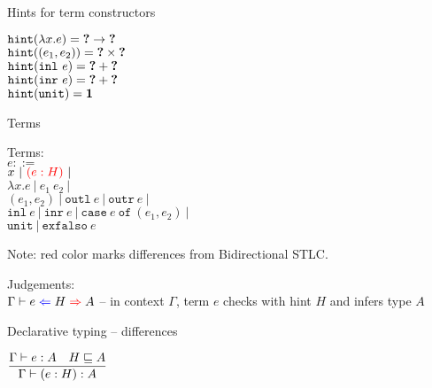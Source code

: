 \documentclass{beamer}
\newcommand{\pipe}{\ |\ }
\newcommand{\Fun}[2]{#1 \to #2}
\newcommand{\Prod}[2]{#1 \times #2}
\newcommand{\Sum}[2]{#1 + #2}
\newcommand{\Unit}{\textbf{1}}
\newcommand{\annot}[2]{(#1 : #2)}
\newcommand{\fun}[2]{\lambda #1. #2}
\newcommand{\app}[2]{#1\ #2}
\newcommand{\pair}[2]{(#1, #2)}
\newcommand{\outl}[1]{\texttt{outl}\ #1}
\newcommand{\outr}[1]{\texttt{outr}\ #1}
\newcommand{\inl}[1]{\texttt{inl}\ #1}
\newcommand{\inr}[1]{\texttt{inr}\ #1}
\newcommand{\case}[3]{\texttt{case}\ #1\ \texttt{of}\ (#2, #3)}
\newcommand{\unit}{\texttt{unit}}
\newcommand{\exfalso}[1]{\texttt{exfalso}\ #1}
\newcommand{\fulltyping}[3]{#1 \vdash #2 : #3}
\newcommand{\typing}[2]{\fulltyping{\Gamma}{#1}{#2}}
\newcommand{\rulename}[1]{\textsc{\footnotesize{#1}}}
\newcommand{\infrule}[3][]{\displaystyle \frac{#2}{#3} \rulename{#1}}
\newcommand{\sidecond}[1]{#1}
\begin{document}
\begin{frame}{Hints for term constructors}

\begin{center}
  $\hintfor{\fun{x}{e}} = \Fun{\Hole}{\Hole}$ \\
  $\hintfor{\pair{e_1}{e_2}} = \Prod{\Hole}{\Hole}$ \\
  $\hintfor{\inl{e}} = \Sum{\Hole}{\Hole}$ \\
  $\hintfor{\inr{e}} = \Sum{\Hole}{\Hole}$ \\
  $\hintfor{\unit} = \Unit$
\end{center}

\end{frame}

\begin{frame}{Terms}

Terms: \\
$e ::=$ \\
\qquad $x \pipe \termdiff{\annot{e}{H}} \pipe $ \\
\qquad $\fun{x}{e} \pipe \app{e_1}{e_2} \pipe$ \\
\qquad $\pair{e_1}{e_2} \pipe \outl{e} \pipe \outr{e} \pipe$ \\
\qquad $\inl{e} \pipe \inr{e} \pipe \case{e}{e_1}{e_2} \pipe$ \\
\qquad $\unit \pipe \exfalso{e}$

\vspace{2em}

Note: red color marks differences from Bidirectional STLC.

\vspace{2em}

Judgements: \\
$\fullhinting{\Gamma}{e}{H}{A}$ -- in context $\Gamma$, term $e$ checks with hint $H$ and infers type $A$

\end{frame}

\begin{frame}{Declarative typing -- differences}

\begin{center}
  $\infrule{\typing{e}{A} \quad \sidecond{\hintorder{H}{A}}}{\typing{\annot{e}{H}}{A}}$
\end{center}

\end{frame}
\end{document}
